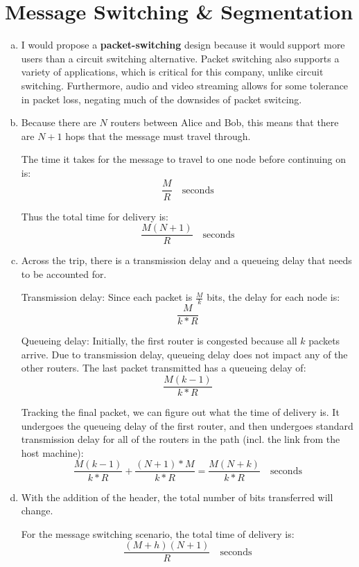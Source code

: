 \documentclass[11pt]{article}
\begin{document}
\section*{Message Switching \& Segmentation}
  \begin{enumerate}[(a)]
    \item
      I would propose a \textbf{packet-switching} design because it would support more
      users than a circuit switching alternative. Packet switching also supports a variety
      of applications, which is critical for this company, unlike circuit switching.
      Furthermore, audio and video streaming allows for some tolerance in packet loss,
      negating much of the downsides of packet switcing.
    \item
      Because there are $N$ routers between Alice and Bob, this means that there are $N+1$
      hops that the message must travel through.

      The time it takes for the message to travel to one node before continuing on is:
      \[ \frac{M}{R} \quad \text{seconds} \]

      Thus the total time for delivery is:
      \[ \frac{M(N+1)}{R} \quad \text{seconds} \]
    \item
      Across the trip, there is a transmission delay and a queueing delay that needs to be
      accounted for.

      Transmission delay: Since each packet is $\frac{M}{k}$ bits, the delay for each node is:
      \[ \frac{M}{k * R} \]

      Queueing delay: Initially, the first router is congested because all $k$ packets
      arrive. Due to transmission delay, queueing delay does not impact any of the other
      routers. The last packet transmitted has a queueing delay of:
      \[ \frac{M(k-1)}{k * R} \]

      Tracking the final packet, we can figure out what the time of delivery is.
      It undergoes the queueing delay of the first router, and then undergoes
      standard transmission delay for all of the routers in the path (incl. the link
      from the host machine):
      \[ \frac{M(k-1)}{k * R} + \frac{(N+1) * M}{k * R} = \boxed{\frac{M(N + k)}{k * R} \quad \text{seconds}} \]
    \item
      With the addition of the header, the total number of bits transferred will change.

      For the message switching scenario, the total time of delivery is:
      \[ \frac{(M + h)(N+1)}{R} \quad \text{seconds} \]


\end{enumerate}
\end{document}
